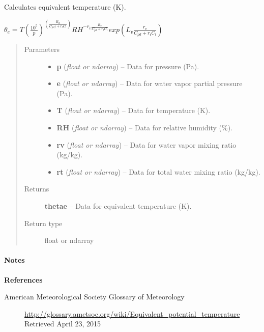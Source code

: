 \documentclass[letterpaper,10pt,english]{sphinxmanual}
\begin{document}

\begin{fulllineitems}
\label{atmos:atmos.equations.thetae_from_p_e_T_RH_rv_rt}
Calculates equivalent temperature (K).

\(\theta_e = T (\frac{10^5}{p})^(\frac{R_d}{C_{pd}) + r_t C_l}) RH^{-r_v
\frac{R_v}{C_{pd} +r_t C_l}} exp(L_v \frac{r_v}{C_{pd}+r_t C_l})\)
\begin{quote}\begin{description}
\item[{Parameters}] \leavevmode\begin{itemize}
\item {} 
\textbf{p} (\emph{float or ndarray}) -- Data for pressure (Pa).

\item {} 
\textbf{e} (\emph{float or ndarray}) -- Data for water vapor partial pressure (Pa).

\item {} 
\textbf{T} (\emph{float or ndarray}) -- Data for temperature (K).

\item {} 
\textbf{RH} (\emph{float or ndarray}) -- Data for relative humidity (\%).

\item {} 
\textbf{rv} (\emph{float or ndarray}) -- Data for water vapor mixing ratio (kg/kg).

\item {} 
\textbf{rt} (\emph{float or ndarray}) -- Data for total water mixing ratio (kg/kg).

\end{itemize}

\item[{Returns}] \leavevmode
\textbf{thetae} --
Data for equivalent temperature (K).

\item[{Return type}] \leavevmode
float or ndarray

\end{description}\end{quote}
\paragraph{Notes}

\textbf{References}
\begin{description}
\item[{American Meteorological Society Glossary of Meteorology}] \leavevmode
\href{http://glossary.ametsoc.org/wiki/Equivalent\_potential\_temperature}{http://glossary.ametsoc.org/wiki/Equivalent\_potential\_temperature}
Retrieved April 23, 2015

\end{description}

\end{fulllineitems}
\end{document}
